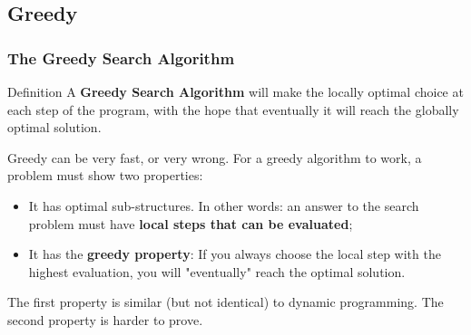%
%
%

\subsection{Greedy}
\begin{frame}
  \frametitle{The Greedy Search Algorithm}

  \begin{block}{Definition}
    A {\bf Greedy Search Algorithm} will make the \alert{locally optimal choice} at each step of the program, with the hope that eventually it will reach the \alert{globally optimal solution}.
  \end{block}
  \vfill

  Greedy can be very fast, or very wrong. For a greedy algorithm to work, a problem must show two properties:
  \begin{itemize}
  \item It has optimal sub-structures. In other words: an answer to the search problem must have {\bf local steps that can be evaluated};

  \item It has the {\bf greedy property}: If you always choose the local step with the highest evaluation, you will "eventually" reach the optimal solution.
  \end{itemize}
  \bigskip

  The first property is similar (but not identical) to dynamic programming. The second property is harder to prove.
\end{frame}

